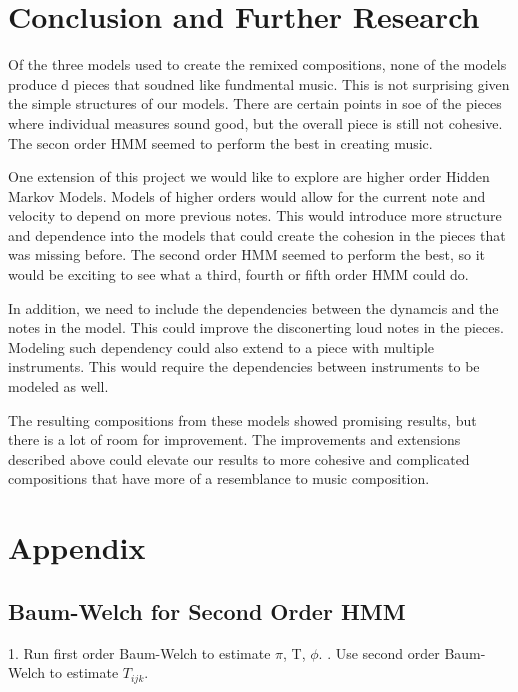 \documentclass{article} %
\begin{document}
\section{Conclusion and Further Research}

Of the three models used to create the remixed compositions, none of the models produce d pieces that soudned like fundmental music. This is not surprising given the simple structures of our models. There are certain points in soe of the pieces where individual measures sound good, but the overall piece is still not cohesive. The secon order HMM seemed to perform the best in creating music. 

One extension of this project we would like to explore are higher order Hidden Markov Models. Models of higher orders would allow for the current note and velocity to depend on more previous notes. This would introduce more structure and dependence into the models that could create the cohesion in the pieces that was missing before. The second order HMM seemed to perform the best, so it would be exciting to see what a third, fourth or fifth order HMM could do. 

In addition, we need to include the dependencies between the dynamcis and the notes in the model. This could improve the disconerting loud notes in the pieces. Modeling such dependency could also extend to a piece with multiple instruments. This would require the dependencies between instruments to be modeled as well. 

The resulting compositions from these models showed promising results, but there is a lot of room for improvement. The improvements and extensions described above could elevate our results to more cohesive and complicated compositions that have more of a resemblance to music composition. 


\newpage

\section{Appendix}

\subsection{Baum-Welch for Second Order HMM}

1. Run first order Baum-Welch to estimate $\pi$, T, $\phi$. . Use second order Baum-Welch to estimate $T_{ijk}$.\newline
\end{document}
